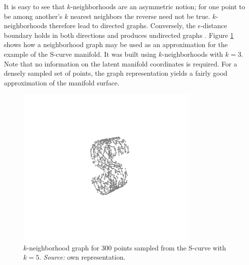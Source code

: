 \begin{minipage}[b]{0.5\textwidth}
  It is easy to see that $k$-neighborhoods are an asymmetric notion; for one 
  point to be among another's $k$ nearest neighbors the reverse need not be 
  true.
  $k$-neighborhoods therefore lead to directed graphs.
  Conversely, the $\epsilon$-distance boundary holds in both directions and 
  produces undirected graphs \citep{heetal2005}.
  Figure \ref{fig:neighbor-graph} shows how a neighborhood graph may be used as 
  an approximation for the example of the S-curve manifold.
  It was built using $k$-neighborhoods with $k = 3$.
  Note that no information on the latent manifold coordinates is required.
  For a densely sampled set of points, the graph representation yields a fairly
  good approximation of the manifold surface.
\end{minipage}
\begin{minipage}[b]{0.05\textwidth}
  \phantom{xxx}
\end{minipage}
\begin{minipage}[b]{0.45\textwidth}
  \begin{figure}[H]
    \centering
    \includegraphics[trim = 250 170 200 140, clip, %
      width = 0.8\textwidth]{figures/s-curve-connected}
    \caption[S-curve neighborhood graph]{$k$-neighborhood graph for 300 points 
    sampled from the S-curve with $k = 5$.
    \textit{Source:} own representation.}
    \label{fig:neighbor-graph}
  \end{figure}
\end{minipage}


